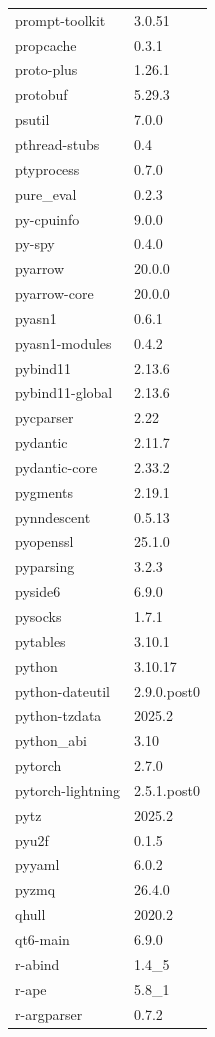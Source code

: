 \begin{longtable}{ll}
    prompt-toolkit&3.0.51 \\
    propcache&0.3.1 \\
    proto-plus&1.26.1 \\
    protobuf&5.29.3 \\
    psutil&7.0.0 \\
    pthread-stubs&0.4 \\
    ptyprocess&0.7.0 \\
    pure\_eval&0.2.3 \\
    py-cpuinfo&9.0.0 \\
    py-spy&0.4.0 \\
    pyarrow&20.0.0 \\
    pyarrow-core&20.0.0 \\
    pyasn1&0.6.1 \\
    pyasn1-modules&0.4.2 \\
    pybind11&2.13.6 \\
    pybind11-global&2.13.6 \\
    pycparser&2.22 \\
    pydantic&2.11.7 \\
    pydantic-core&2.33.2 \\
    pygments&2.19.1 \\
    pynndescent&0.5.13 \\
    pyopenssl&25.1.0 \\
    pyparsing&3.2.3 \\
    pyside6&6.9.0 \\
    pysocks&1.7.1 \\
    pytables&3.10.1 \\
    python&3.10.17 \\
    python-dateutil&2.9.0.post0 \\
    python-tzdata&2025.2 \\
    python\_abi&3.10 \\
    pytorch&2.7.0 \\
    pytorch-lightning&2.5.1.post0 \\
    pytz&2025.2 \\
    pyu2f&0.1.5 \\
    pyyaml&6.0.2 \\
    pyzmq&26.4.0 \\
    qhull&2020.2 \\
    qt6-main&6.9.0 \\
    r-abind&1.4\_5 \\
    r-ape&5.8\_1 \\
    r-argparser&0.7.2 \\

\end{longtable}
